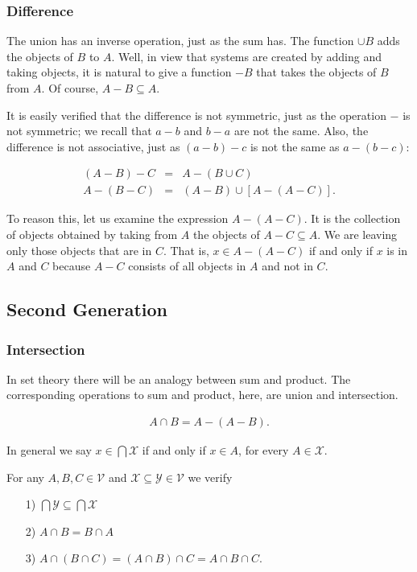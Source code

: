 \documentclass [12pt]{book}
\begin{document}
\subsubsection{Difference} The union has an inverse operation, just as the sum has. The function $\cup B$ adds the objects of $B$ to $A$. Well, in view that systems are created by adding and taking objects, it is natural to give a function $-B$ that takes the objects of $B$ from $A$. Of course, $A-B\subseteq A$.

It is easily verified that the difference is not symmetric, just as the operation $-$ is not symmetric; we recall that $a-b$ and $b-a$ are not the same. Also, the difference is not associative, just as $(a-b)-c$ is not the same as $a-(b-c)$:

\begin{eqnarray}\nonumber(A-B)-C&=&A-(B\cup C)\\\nonumber A-(B-C)&=&(A-B)\cup[A-(A-C)].\end{eqnarray}

To reason this, let us examine the expression $A-(A-C)$. It is the collection of objects obtained by taking from $A$ the objects of $A-C\subseteq A$. We are leaving only those objects that are in $C$. That is, $x\in A-(A-C)$ if and only if $x$ is in $A$ and $C$ because $A-C$ consists of all objects in $A$ and not in $C$.

	\subsection{Second Generation}

		\subsubsection{Intersection} In set theory there will be an analogy between sum and product. The corresponding operations to sum and product, here, are union and intersection.

\begin{eqnarray}\nonumber A\cap B=A-(A-B).\end{eqnarray}

In general we say $x\in\bigcap\mathcal{X}$ if and only if $x\in A$, for every $A\in\mathcal{X}$.

\begin{proposition}For any $A,B,C\in\mathcal{V}$ and $\mathcal{X}\subseteq\mathcal{Y}\in\mathcal{V}$ we verify\begin{itemize}\item[1)]$\bigcap\mathcal{Y}\subseteq\bigcap\mathcal{X}$\item[2)]$A\cap B=B\cap A$\item[3)]$A\cap(B\cap C)=(A\cap B)\cap C=A\cap B\cap C$.\end{itemize}\end{proposition}
\end{document}
